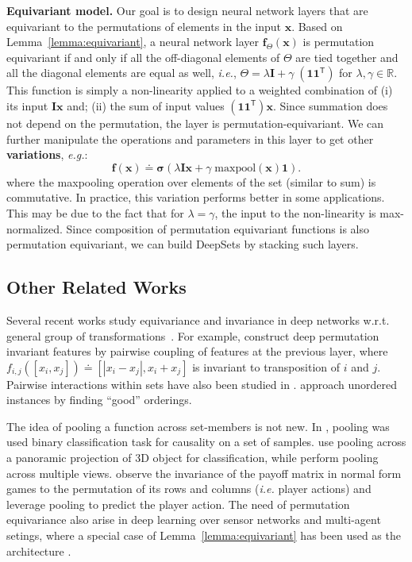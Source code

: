 \documentclass{article}
\newcommand{\xx}[0]{\ensuremath{\mathbf{x}}}
\newcommand{\ff}[0]{\ensuremath{\mathbf{f}}}
\newcommand{\latinphrase}[1]{\emph{#1}}    %
\newcommand{\ie}{\latinphrase{i.e.}\xspace}
\newcommand{\eg}{\latinphrase{e.g.}\xspace}
\newcommand{\deepsets}{DeepSets\xspace}
\begin{document}
\textbf{Equivariant model.}
Our goal is to design neural network layers that are equivariant to the permutations of elements in the input $\xx$. Based on Lemma~\ref{lemma:equivariant}, a neural network layer $\ff_\Theta(\xx)$ is permutation equivariant if and only if all the off-diagonal elements of $\Theta$ are tied together and all the diagonal elements are equal as well, \ie,
$ \Theta = {\lambda} \mathbf{I} + {\gamma} \; (\mathbf{1} \mathbf{1}^{\mathsf{T}})$ for ${\lambda},{\gamma} \in \mathbb{R}$.
This function is simply a non-linearity applied to a weighted combination of (i) its input $ \mathbf{I} \xx$ and; (ii) the sum of input values $(\mathbf{1} \mathbf{1}^{\mathsf{T}}) \xx$. Since summation does not depend on the permutation, the layer is permutation-equivariant. We can further manipulate the operations and parameters in this layer to get other \textbf{variations}, \eg:
\begin{equation}
  \label{eq:3}
 \ff(\xx) \doteq \boldsymbol{\sigma}\left(\lambda \mathbf{I} \xx + \gamma\; \textrm{maxpool}({\xx}) \mathbf{1} \right).
\end{equation}
where the maxpooling operation over elements of the set (similar to sum) is commutative. 
In practice, this variation performs better in some applications. This may be due to the fact that for $\lambda = \gamma$, the input to the non-linearity is max-normalized. Since composition of permutation equivariant functions is also permutation equivariant, we can build \deepsets by stacking such layers.

\subsection{Other Related Works}\label{sec:related}
Several recent works study equivariance and invariance in deep networks w.r.t. general group of transformations~\cite{gens2014deep,cohen2016group,ravanbakhsh_symmetry}.
For example, \cite{chen2014unsupervised} construct deep permutation invariant features by 
pairwise coupling of features at the previous layer, where $f_{i,j}([x_i, x_j]) \doteq [|x_i - x_j|, x_i+x_j]$ 
is invariant to transposition of $i$ and $j$. Pairwise interactions within sets have also been studied in \cite{chang2016compositional,guttenberg2016permutation}.
\cite{vinyals2015order} approach unordered instances by finding ``good'' orderings.

The idea of pooling a function across set-members is not new. In \cite{lopez2016discovering}, pooling was used binary classification
task for causality on a set of samples. \cite{shi2015deeppano} use pooling across a panoramic projection of 3D object for classification, while \cite{su2015multi} perform pooling across multiple views.
\cite{hartford2016deep} observe the invariance of the payoff matrix in normal form games to the permutation of its rows and columns (\ie player actions) and leverage pooling to predict the player action. The need of permutation equivariance also arise in deep learning over sensor networks and multi-agent setings, where a special case of Lemma~\ref{lemma:equivariant} has been used as the architecture  \cite{sukhbaatar2016learning}.
\end{document}
